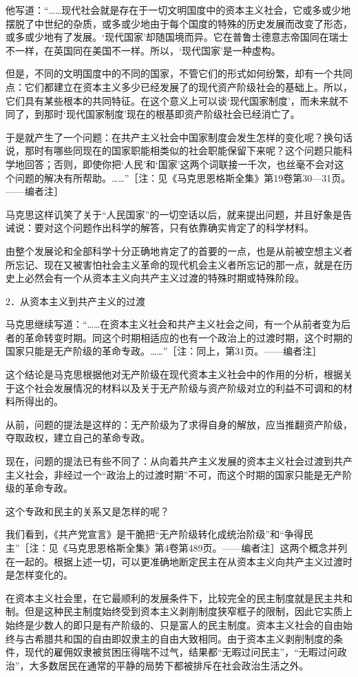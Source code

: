 \documentclass[UTF8, 12pt, a4paper]{ctexrep}
\begin{document}
他写道：“……现代社会就是存在于一切文明国度中的资本主义社会，它或多或少地摆脱了中世纪的杂质，或多或少地由于每个国度的特殊的历史发展而改变了形态，或多或少地有了发展。‘现代国家’却随国境而异。它在普鲁士德意志帝国同在瑞士不一样，在英国同在美国不一样。所以，‘现代国家’是一种虚构。

但是，不同的文明国度中的不同的国家，不管它们的形式如何纷繁，却有一个共同点：它们都建立在资本主义多少已经发展了的现代资产阶级社会的基础上。所以，它们具有某些根本的共同特征。在这个意义上可以谈‘现代国家制度’，而未来就不同了，到那时‘现代国家制度’现在的根基即资产阶级社会已经消亡了。

于是就产生了一个问题：在共产主义社会中国家制度会发生怎样的变化呢？换句话说，那时有哪些同现在的国家职能相类似的社会职能保留下来呢？这个问题只能科学地回答；否则，即使你把‘人民’和‘国家’这两个词联接一千次，也丝毫不会对这个问题的解决有所帮助。……”［注：见《马克思恩格斯全集》第19卷第30—31页。——编者注］

马克思这样讥笑了关于“人民国家”的一切空话以后，就来提出问题，并且好象是告诫说：要对这个问题作出科学的解答，只有依靠确实肯定了的科学材料。

由整个发展论和全部科学十分正确地肯定了的首要的一点，也是从前被空想主义者所忘记、现在又被害怕社会主义革命的现代机会主义者所忘记的那一点，就是在历史上必然会有一个从资本主义向共产主义过渡的特殊时期或特殊阶段。

2．从资本主义到共产主义的过渡

马克思继续写道：“……在资本主义社会和共产主义社会之间，有一个从前者变为后者的革命转变时期。同这个时期相适应的也有一个政治上的过渡时期，这个时期的国家只能是无产阶级的革命专政。……”［注：同上，第31页。——编者注］

这个结论是马克思根据他对无产阶级在现代资本主义社会中的作用的分析，根据关于这个社会发展情况的材料以及关于无产阶级与资产阶级对立的利益不可调和的材料所得出的。

从前，问题的提法是这样的：无产阶级为了求得自身的解放，应当推翻资产阶级，夺取政权，建立自己的革命专政。

现在，问题的提法已有些不同了：从向着共产主义发展的资本主义社会过渡到共产主义社会，非经过一个“政治上的过渡时期”不可，而这个时期的国家只能是无产阶级的革命专政。

这个专政和民主的关系又是怎样的呢？

我们看到，《共产党宣言》是干脆把“无产阶级转化成统治阶级”和“争得民主”［注：见《马克思恩格斯全集》第4卷第489页。——编者注］这两个概念并列在一起的。根据上述一切，可以更准确地断定民主在从资本主义向共产主义过渡时是怎样变化的。

在资本主义社会里，在它最顺利的发展条件下，比较完全的民主制度就是民主共和制。但是这种民主制度始终受到资本主义剥削制度狭窄框子的限制，因此它实质上始终是少数人的即只是有产阶级的、只是富人的民主制度。资本主义社会的自由始终与古希腊共和国的自由即奴隶主的自由大致相同。由于资本主义剥削制度的条件，现代的雇佣奴隶被贫困压得喘不过气，结果都“无暇过问民主”，“无暇过问政治”，大多数居民在通常的平静的局势下都被排斥在社会政治生活之外。
\end{document}
